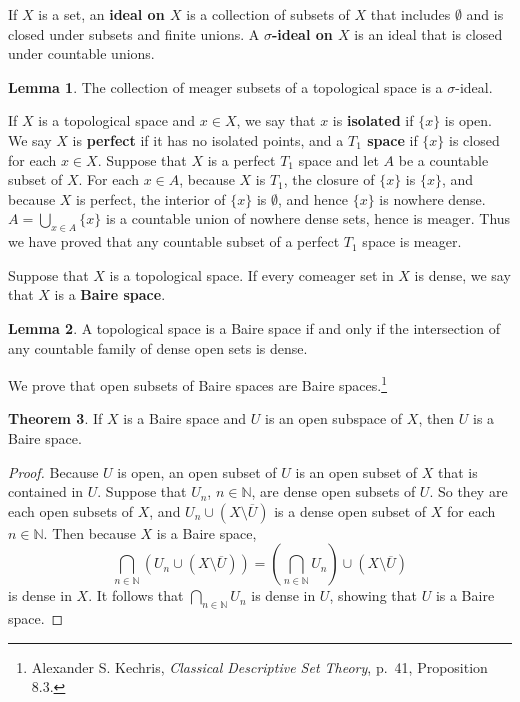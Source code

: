 \documentclass{article}
\theoremstyle{definition}
\newtheorem{theorem}{Theorem}
\newtheorem{lemma}[theorem]{Lemma}
\theoremstyle{definition}
\begin{document}
If $X$ is a set, an \textbf{ideal on $X$} is a collection of subsets of $X$ that includes $\emptyset$ and is closed under subsets and finite unions. A
\textbf{$\sigma$-ideal on $X$} is an ideal that is closed under countable unions.

\begin{lemma}
The collection of meager subsets of a topological space is a $\sigma$-ideal.
\end{lemma}


If $X$ is a topological space and $x \in X$, we say that $x$ is \textbf{isolated} if $\{x\}$ is open. We say $X$ is \textbf{perfect}
if it has no isolated points, and a \textbf{$T_1$ space} if $\{x\}$ is closed for each $x \in X$. Suppose that $X$ is a perfect $T_1$ space and let $A$ be a countable subset of $X$. 
For each $x \in A$, because $X$ is $T_1$, the closure of $\{x\}$ is $\{x\}$, and because $X$ is perfect, the interior of $\{x\}$ is $\emptyset$, and hence
$\{x\}$ is nowhere dense. $A=\bigcup_{x \in A} \{x\}$ is a countable union of nowhere dense sets, hence is meager. Thus we have proved
that any countable subset of a perfect $T_1$ space is meager.   

Suppose that $X$ is a topological space. If every comeager set in $X$ is dense, we say that $X$ is a \textbf{Baire space}. 

\begin{lemma}
A topological space is a Baire space if and only if the intersection of any countable family of  dense open sets is dense.
\end{lemma}

We prove that open subsets of Baire spaces are Baire spaces.\footnote{Alexander S. Kechris, {\em Classical Descriptive Set Theory}, p.~41, Proposition
8.3.}

\begin{theorem}
If $X$ is a Baire space and $U$ is an open subspace of $X$, then $U$ is a Baire space.
\end{theorem}
\begin{proof}
Because $U$ is open, an open subset of $U$ is an open subset of $X$ that is contained in $U$. 
Suppose that $U_n$, $n \in \mathbb{N}$, are dense open subsets of $U$. So they are each open subsets of $X$, 
and $U_n \cup (X \setminus \overline{U})$ is a dense open subset of $X$ for each $n \in \mathbb{N}$. 
Then because $X$ is a Baire space, 
\[
\bigcap_{n \in \mathbb{N}} (U_n \cup (X \setminus \overline{U})) = \left( \bigcap_{n \in \mathbb{N}} U_n \right) \cup (X \setminus \overline{U})
\]
is dense in $X$. It follows that $\bigcap_{n \in \mathbb{N}} U_n$ is dense in $U$, showing that $U$ is a Baire space.
\end{proof} 
\end{document}
